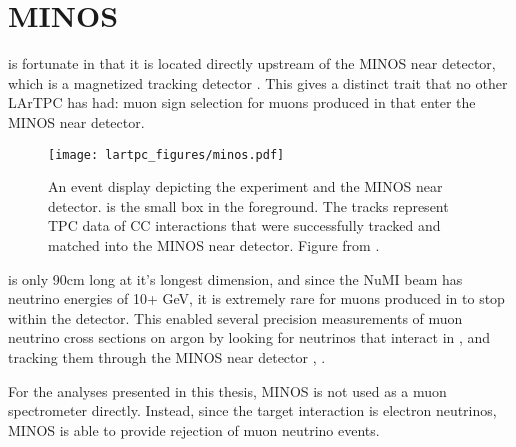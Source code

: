 \section{MINOS}

\argoneut is fortunate in that it is located directly upstream of the MINOS near detector, which is a magnetized tracking detector \cite{MINOS}.  This gives \argoneut a distinct trait that no other LArTPC has had: muon sign selection for muons produced in \argoneut that enter the MINOS near detector.


\begin{figure}[h]
  \centering
  \texttt{[image: lartpc\_figures/minos.pdf]}
  \caption{An event display depicting the \argoneut experiment and the MINOS near detector. \argoneut is the small box in the foreground.  The tracks represent TPC data of \numu CC interactions that were successfully tracked and matched into the MINOS near detector.  Figure from \cite{Anderson:2012vc}.}
  \label{fig:signal_shaping}
\end{figure}

\argoneut is only 90cm long at it's longest dimension, and since the NuMI beam has neutrino energies of 10+ GeV, it is extremely rare for muons produced in \argoneut to stop within the detector.  This enabled several precision measurements of muon neutrino cross sections on argon by looking for neutrinos that interact in \argoneut, and tracking them through the MINOS near detector \cite{argoneut_numu}, \cite{argoneut_antinumu}.

For the analyses presented in this thesis, MINOS is not used as a muon spectrometer directly.  Instead, since the target interaction is electron neutrinos, MINOS is able to provide rejection of muon neutrino events.
